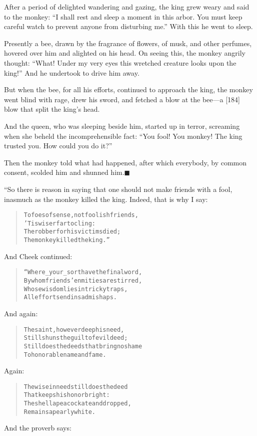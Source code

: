 \documentclass[article, twoside, 14pt]{memoir}
\newcommand{\qed}{\hfill \ensuremath{\blacksquare}}
\renewenvironment{verbatim}{%
\begin{quote}%
\vskip -10pt%
\begin{alltt}\normalfont\large}{\end{alltt}%
\end{quote}%
\vskip -10pt
} %
\begin{document}
After a period of delighted wandering and gazing, the king grew
weary and said to the monkey:
``I shall rest and sleep a moment in this arbor. You must keep careful watch to prevent anyone from disturbing me.''
With this he went to sleep.

Presently a bee, drawn by the fragrance of flowers, of musk, and
other perfumes, hovered over him and alighted on his head. On
seeing this, the monkey angrily thought:
``What! Under my very eyes this wretched creature looks upon the king!''
And he undertook to drive him away.

But when the bee, for all his efforts, continued to approach the
king, the monkey went blind with rage, drew his sword, and fetched
a blow at the bee---a [184] blow that split the king's head.

And the queen, who was sleeping beside him, started up in terror,
screaming when she beheld the incomprehensible fact:
``You fool! You monkey! The king trusted you. How could you do it?''

Then the monkey told what had happened, after which everybody, by
common consent, scolded him and shunned him.\hyperref[s34]{\qed}

“So there is reason in saying that one should not make friends with
a fool, inasmuch as the monkey killed the king. Indeed, that is why
I say:

\begin{verbatim}
To foes of sense, not foolish friends,
    'Tis wiser far to cling:
The robber for his victims died;
    The monkey killed the king.”
\end{verbatim}
And Cheek continued:

\begin{verbatim}
“Where _your_ sort have the final word,
By whom friends' enmities are stirred,
Whose wisdom lies in tricky traps,
All efforts end in sad mishaps.
\end{verbatim}
And again:

\begin{verbatim}
The saint, however deep his need,
Still shuns the guilt of evil deed;
Still does the deeds that bring no shame
To honorable name and fame.
\end{verbatim}
Again:

\begin{verbatim}
The wise in need still does the deed
    That keeps his honor bright:
The shell a peacock ate and dropped,
    Remains a pearly white.
\end{verbatim}
And the proverb says:
\end{document}
